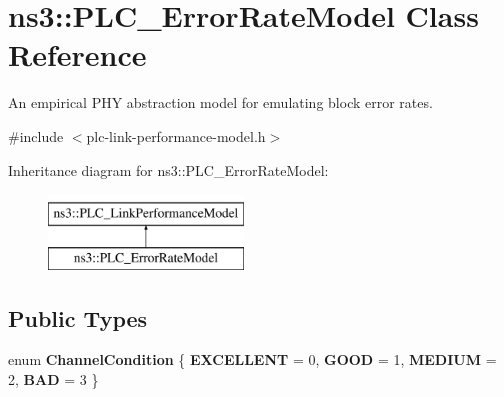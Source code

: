 \hypertarget{classns3_1_1PLC__ErrorRateModel}{\section{ns3\-:\-:\-P\-L\-C\-\_\-\-Error\-Rate\-Model \-Class \-Reference}
\label{classns3_1_1PLC__ErrorRateModel}
}


\-An empirical \-P\-H\-Y abstraction model for emulating block error rates.  




{\ttfamily \#include $<$plc-\/link-\/performance-\/model.\-h$>$}

\-Inheritance diagram for ns3\-:\-:\-P\-L\-C\-\_\-\-Error\-Rate\-Model\-:\begin{figure}[H]
\begin{center}
\leavevmode
\includegraphics[height=2.000000cm]{classns3_1_1PLC__ErrorRateModel}
\end{center}
\end{figure}
\subsection*{\-Public \-Types}
\begin{DoxyCompactItemize}
\item 
enum {\bfseries \-Channel\-Condition} \{ {\bfseries \-E\-X\-C\-E\-L\-L\-E\-N\-T} =  0, 
{\bfseries \-G\-O\-O\-D} =  1, 
{\bfseries \-M\-E\-D\-I\-U\-M} =  2, 
{\bfseries \-B\-A\-D} =  3
 \}
\end{DoxyCompactItemize}
